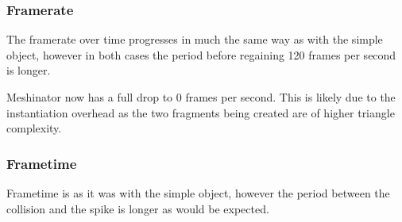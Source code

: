 \subsubsection{Framerate}

The framerate over time progresses in much the same way as with the simple object, however in both cases the period before regaining 120 frames per second is longer.

Meshinator now has a full drop to 0 frames per second. This is likely due to the instantiation overhead as the two fragments being created are of higher triangle complexity. 

\subsubsection{Frametime}

Frametime is as it was with the simple object, however the period between the collision and the spike is longer as would be expected.

\FloatBarrier

